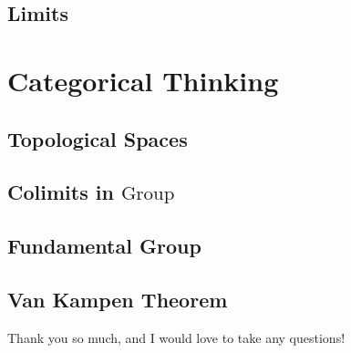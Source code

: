 \documentclass{notes}
\begin{document}
\vspace{-3ex}

\subsection{Limits}

\vspace{-3ex}

\section{Categorical Thinking}

\vspace{-3ex}

\subsection{Topological Spaces}

\vspace{-3ex}

\subsection{Colimits in $\text{Group}$}

\vspace{-3ex}

\subsection{Fundamental Group}

\vspace{-3ex}

\subsection{Van Kampen Theorem}

\vspace{-3ex}\lipsum[2]


\vspace{-8.5ex}
Thank you so much, and I would love to take any questions!
\end{document}
